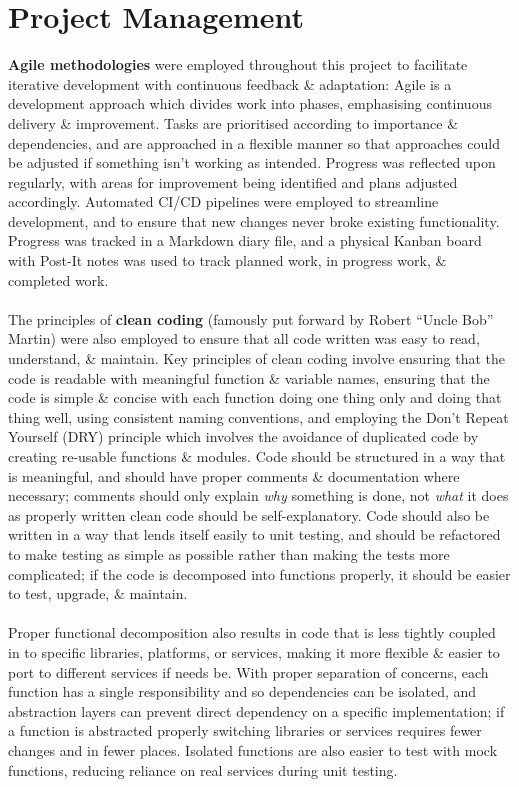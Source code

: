 \documentclass[a4paper,11pt]{report}
\begin{document}
\section{Project Management}
\textbf{Agile methodologies}\supercite{agile} were employed throughout this project to facilitate iterative development with continuous feedback \& adaptation:
Agile is a development approach which divides work into phases, emphasising continuous delivery \& improvement.
Tasks are prioritised according to importance \& dependencies, and are approached in a flexible manner so that approaches could be adjusted if something isn't working as intended.
Progress was reflected upon regularly, with areas for improvement being identified and plans adjusted accordingly.
Automated CI/CD pipelines were employed to streamline development, and to ensure that new changes never broke existing functionality.
Progress was tracked in a Markdown diary file, and a physical Kanban\supercite{kanban} board with Post-It notes was used to track planned work, in progress work, \& completed work.
\\\\
The principles of \textbf{clean coding}\supercite{martin2008cleancode} (famously put forward by Robert ``Uncle Bob'' Martin) were also employed to ensure that all code written was easy to read, understand, \& maintain.
Key principles of clean coding involve ensuring that the code is readable with meaningful function \& variable names, ensuring that the code is simple \& concise with each function doing one thing only and doing that thing well, using consistent naming conventions, and employing the Don't Repeat Yourself (DRY) principle which involves the avoidance of duplicated code by creating re-usable functions \& modules.
Code should be structured in a way that is meaningful, and should have proper comments \& documentation where necessary;
comments should only explain \textit{why} something is done, not \textit{what} it does as properly written clean code should be self-explanatory.
Code should also be written in a way that lends itself easily to unit testing, and should be refactored to make testing as simple as possible rather than making the tests more complicated;
if the code is decomposed into functions properly, it should be easier to test, upgrade, \& maintain.
\\\\
Proper functional decomposition also results in code that is less tightly coupled in to specific libraries, platforms, or services, making it more flexible \& easier to port to different services if needs be.
With proper separation of concerns, each function has a single responsibility and so dependencies can be isolated, and abstraction layers can prevent direct dependency on a specific implementation;
if a function is abstracted properly switching libraries or services requires fewer changes and in fewer places.
Isolated functions are also easier to test with mock functions, reducing reliance on real services during unit testing.
\end{document}
